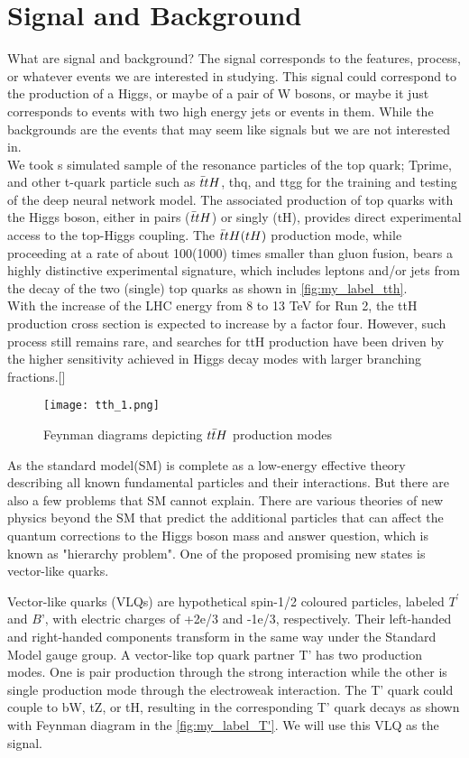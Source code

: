 \chapter{\label{d}Signal and Background}
What are signal and background? The signal corresponds to the features, process, or whatever events we are interested in studying. This signal could correspond to the production of a Higgs, or maybe of a pair of W bosons, or maybe it just corresponds to events with two high energy jets or events in them. While the backgrounds are the events that may seem like signals but we are not interested in.\\
We took s simulated sample of the resonance particles of the top quark; Tprime, and other t-quark particle such as $\Bar{t}tH$, thq, and ttgg for the training and testing of the deep neural network model.
The associated production of top quarks with the Higgs boson, either in pairs ($\Bar{t}tH$) or singly (tH), provides direct experimental access to the top-Higgs
coupling. The $\Bar{t}tH (tH)$ production mode, while proceeding at a rate of about 100(1000) times smaller than gluon fusion, bears a highly distinctive experimental signature, which includes leptons and/or jets from the decay of the two (single) top quarks as shown in \autoref{fig:my_label_tth}. \\
With the increase of the LHC energy from 8 to 13 TeV for Run 2, the ttH production cross section is expected to increase by a factor four. However, such process still remains rare, and searches for ttH production have been driven by the higher sensitivity achieved in Higgs decay modes with larger branching fractions.[\cite{14}] \\
\begin{figure}[H]
    \centering
    \texttt{[image: tth\_1.png]}
    \caption{Feynman diagrams depicting $t\Bar{t}H$ production modes}
    \label{fig:my_label_tth}
\end{figure}


As the standard model(SM) is complete as a low-energy effective theory describing all known fundamental particles and their interactions. But there are also a few problems that SM cannot explain. There are various theories of new physics beyond the SM that predict the additional particles that can affect the quantum corrections to the Higgs boson mass and answer question, which is known as "hierarchy problem". One of the proposed promising new states is vector-like quarks.\cite{12}

Vector-like quarks (VLQs) are hypothetical spin-1/2 coloured particles, labeled $T^'$ and $B’$, with electric charges of +2e/3 and -1e/3, respectively. Their left-handed and right-handed components transform in the same way under the Standard Model gauge group. A vector-like top quark partner T' has two production modes. One is pair production through the strong interaction while the other is single production mode through the electroweak interaction\cite{12}. The T' quark could couple to bW, tZ, or tH, resulting in the corresponding T' quark decays as shown with Feynman diagram in the \autoref{fig:my_label_T'}. We will use this VLQ as the signal.\\




